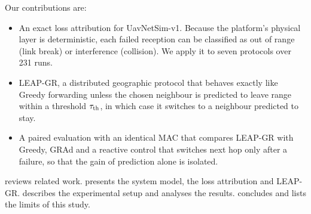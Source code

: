 Our contributions are:
\begin{itemize}
  \item An exact loss attribution for UavNetSim-v1. Because the platform's physical layer is deterministic,
  each failed reception can be classified as out of range (link break) or interference (collision). We apply
  it to seven protocols over 231 runs.
  \item LEAP-GR, a distributed geographic protocol that behaves exactly like Greedy forwarding unless the
  chosen neighbour is predicted to leave range within a threshold $\tau_{\mathrm{th}}$, in which case it switches to a
  neighbour predicted to stay.
  \item A paired evaluation with an identical MAC that compares LEAP-GR with Greedy, GRAd and a reactive
  control that switches next hop only after a failure, so that the gain of prediction alone is isolated.
\end{itemize}

 reviews related work.  presents the system model, the loss attribution
and LEAP-GR.  describes the experimental setup and analyses the results.
 concludes and lists the limits of this study.
